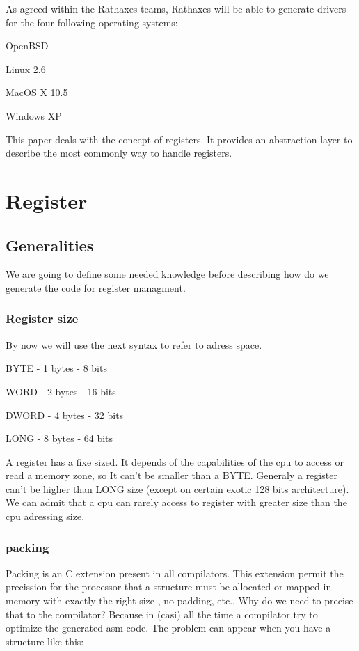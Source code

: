 \documentclass[11pt]{report}
\begin{document}
As agreed within the Rathaxes teams, Rathaxes will be able to generate drivers
for the four following operating systems:
\begin{description}
    \item{OpenBSD}
    \item{Linux 2.6}
    \item{MacOS X 10.5}
    \item{Windows XP}
\end{description}

This paper deals with the concept of registers. It provides
an abstraction layer to describe the most commonly way to handle 
registers.

\tableofcontents

\chapter{Register}

\section{Generalities}

We are going to define some needed knowledge before describing how do we 
generate the code for register managment.

\subsection{Register size}

By now we will use the next syntax to refer to adress space.

\begin{description}
	\item{BYTE - 1 bytes - 8 bits}
	\item{WORD - 2 bytes - 16 bits}
	\item{DWORD - 4 bytes - 32 bits}
	\item{LONG - 8 bytes - 64 bits}
\end{description}

A register has a fixe sized. It depends of the capabilities of the cpu to access
or read a memory zone, so It can't be smaller than a BYTE. Generaly a register
can't be higher than LONG size (except on certain exotic 128 bits architecture).
We can admit that a cpu can rarely access to register with greater size than the
cpu adressing size. 

\subsection{packing}
Packing is an C extension present in all compilators. This extension permit
the precission for the processor that a structure must be allocated or mapped
in memory with exactly the right size , no padding, etc.. Why do we need to
precise that to the compilator? Because in (casi) all the time a compilator try
to optimize the generated asm code. The problem can appear when you have a structure 
like this:
\end{document}
